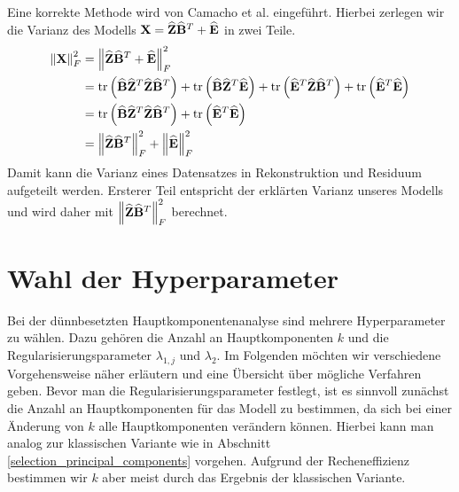 Eine korrekte Methode wird von Camacho et al. eingeführt. Hierbei zerlegen wir die Varianz des Modells $\mathbf{X} = \widehat{\mathbf{Z}} \widehat{\mathbf{B}}^T + \widehat{\mathbf{E}}$ in zwei Teile.
\begin{align}
\label{camacho_explained_variance}
\left\lVert \mathbf{X} \right\rVert_F^2 & = \left\lVert \widehat{\mathbf{Z}} \widehat{\mathbf{B}}^T + \widehat{\mathbf{E}} \right\rVert_{F}^{2} \nonumber\\
& = \text{tr} \left( \widehat{\mathbf{B}} \widehat{\mathbf{Z}}^T \widehat{\mathbf{Z}} \widehat{\mathbf{B}}^T \right) + \text{tr} \left( \widehat{\mathbf{B}} \widehat{\mathbf{Z}}^T \widehat{\mathbf{E}} \right) + \text{tr} \left( \widehat{\mathbf{E}}^T\widehat{\mathbf{Z}} \widehat{\mathbf{B}}^T \right) + \text{tr} \left( \widehat{\mathbf{E}}^T \widehat{\mathbf{E}} \right) \nonumber\\
& = \text{tr} \left( \widehat{\mathbf{B}} \widehat{\mathbf{Z}}^T \widehat{\mathbf{Z}} \widehat{\mathbf{B}}^T \right) + \text{tr} \left( \widehat{\mathbf{E}}^T \widehat{\mathbf{E}} \right) \nonumber\\
& = \left\lVert \widehat{\mathbf{Z}} \widehat{\mathbf{B}}^T \right\rVert_{F}^{2} + \left\lVert \widehat{\mathbf{E}} \right\rVert_{F}^{2}
\end{align}
Damit kann die Varianz eines Datensatzes in Rekonstruktion und Residuum aufgeteilt werden. Ersterer Teil entspricht der erklärten Varianz unseres Modells und wird daher mit $\left\lVert \widehat{\mathbf{Z}} \widehat{\mathbf{B}}^T \right\rVert_{F}^{2}$ berechnet. 



\section{Wahl der Hyperparameter}
\label{choice_of_tuning_parameters}

Bei der dünnbesetzten Hauptkomponentenanalyse sind mehrere Hyperparameter zu wählen. Dazu gehören die Anzahl an Hauptkomponenten $k$ und die Regularisierungsparameter $\lambda_{1,j}$ und $\lambda_2$. Im Folgenden möchten wir verschiedene Vorgehensweise näher erläutern und eine Übersicht über mögliche Verfahren geben. Bevor man die Regularisierungsparameter festlegt, ist es sinnvoll zunächst die Anzahl an Hauptkomponenten für das Modell zu bestimmen, da sich bei einer Änderung von $k$ alle Hauptkomponenten verändern können. Hierbei kann man analog zur klassischen Variante wie in Abschnitt \ref{selection_principal_components} vorgehen. Aufgrund der Recheneffizienz bestimmen wir $k$ aber meist durch das Ergebnis der klassischen Variante.

